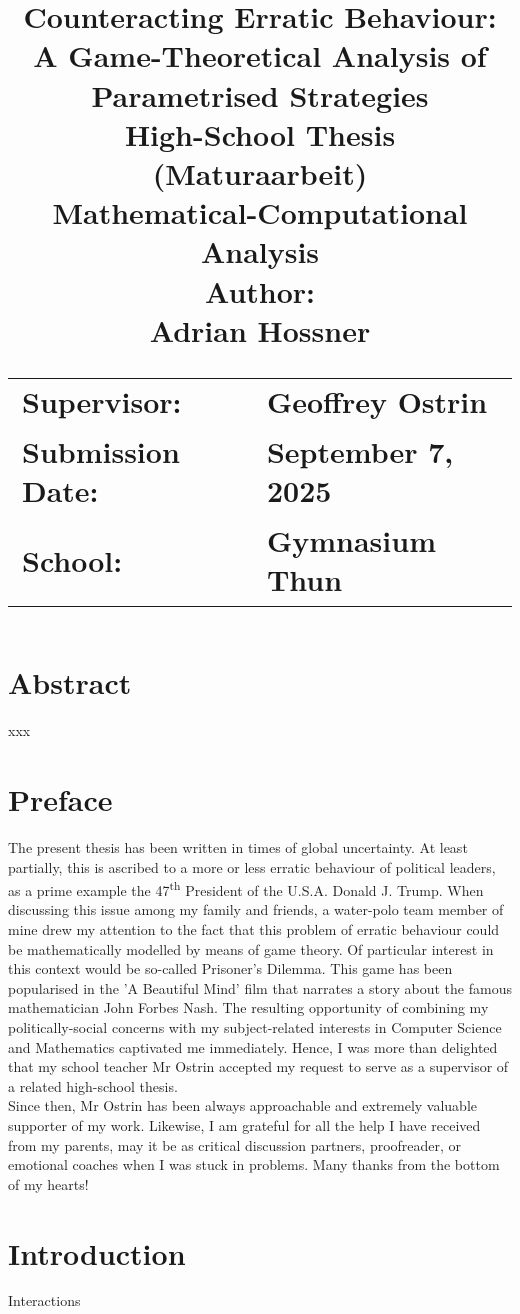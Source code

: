\documentclass[11pt]{article}
\title{
	\textbf{Counteracting Erratic Behaviour:}\\
	\textbf{A Game-Theoretical Analysis of Parametrised Strategies}\\[6ex]
	\Large{High-School Thesis}\\
	\Large{(Maturaarbeit)}\\[\vdist]
	\Large{Mathematical-Computational}\\
	\Large{Analysis}\\[\vdist]
	\Large{Author:}\\
	\Large{Adrian Hossner}\\[3\vdist]
	\begin{flushleft}
		\begin{tabular}{>{\raggedright\arraybackslash}p{5cm} >{\raggedright\arraybackslash}p{5cm}}
			\Large{Supervisor: } & \Large{Geoffrey Ostrin}\\[\vdist]
			\Large{Submission Date: } & \Large{September 7, 2025}\\[\vdist]
			\Large{School: } & \Large{Gymnasium Thun}\\[\vdist]
		\end{tabular}
	\end{flushleft}
}
\date{ } %
\begin{document}
\maketitle
{}

\newpage
{}

\section*{Abstract}
xxx

\newpage

\section*{Preface}
The present thesis has been written in times of global uncertainty.
At least partially, this is ascribed to a more or less erratic behaviour of political leaders, as a prime example the 47\textsuperscript{th} President of the U.S.A. Donald J. Trump.
When discussing this issue among my family and friends, a water-polo team member of mine drew my attention to the fact that this problem of erratic behaviour could be mathematically modelled by means of game theory.
Of particular interest in this context would be so-called Prisoner's Dilemma.
This game has been popularised in the 'A Beautiful Mind' film that narrates a story about the famous mathematician John Forbes Nash.
The resulting opportunity of combining my politically-social concerns with my subject-related interests in Computer Science and Mathematics captivated me immediately.
Hence, I was more than delighted that my school teacher Mr Ostrin accepted my request to serve as a supervisor of a related high-school thesis.\\
\indent Since then, Mr Ostrin has been always approachable and extremely valuable supporter of my work.
Likewise, I am grateful for all the help I have received from my parents, may it be as critical discussion partners, proofreader, or emotional coaches when I was stuck in problems. Many thanks from the bottom of my hearts!

\newpage

\tableofcontents
\newpage


\section{Introduction}
Interactions 
\end{document}
